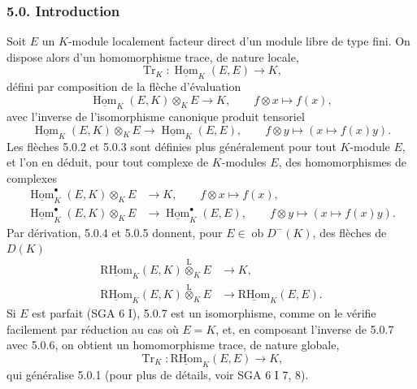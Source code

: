 \documentclass[11pt]{article}
\DeclareMathOperator{\Hom}{Hom}
\newcommand{\ob}{\operatorname{ob}}
\providecommand{\RHom}{\mathrm{RHom}}
\providecommand{\uRHom}{\underline{\RHom}}
\providecommand{\uHom}{\underline{\Hom}}
\providecommand{\Tr}{\operatorname{Tr}}
\providecommand{\Tr}{\operatorname{Tr}}
\providecommand{\lten}{\overset{\mathrm L}{\otimes}}
\providecommand{\Tr}{\operatorname{Tr}}
\providecommand{\RHom}{\mathrm{RHom}}
\providecommand{\Hom}{\operatorname{Hom}}
\providecommand{\ob}{\operatorname{ob}}
\providecommand{\lten}{\overset{\mathrm L}{\otimes}}
\providecommand{\RHom}{\mathrm R\mathcal{H}om}
\providecommand{\lten}{\overset{\mathrm L}{\otimes}}
\providecommand{\Tr}{\operatorname{Tr}}
\providecommand{\lten}{\overset{\mathrm L}{\otimes}}
\providecommand{\lten}{\overset{\mathrm L}{\otimes}}
\providecommand{\lten}{\overset{\mathrm L}{\otimes}}
\providecommand{\RHom}{\mathrm{RHom}}
\providecommand{\Hom}{\operatorname{Hom}}
\providecommand{\Tr}{\operatorname{Tr}}
\providecommand{\lten}{\overset{\mathrm L}{\otimes}}
\begin{document}
\subsubsection*{5.0. Introduction}

Soit $E$ un $K$-module localement facteur direct d'un module libre de type fini. On dispose alors d'un homomorphisme trace, de nature locale,
\begin{equation}\tag{5.0.1}
\Tr_K:\uHom_K(E,E)\longrightarrow K,
\end{equation}
défini par composition de la flèche d'évaluation
\begin{equation}\tag{5.0.2}
\uHom_K(E,K)\otimes_KE\longrightarrow K,\qquad f\otimes x\longmapsto f(x),
\end{equation}
avec l'inverse de l'isomorphisme canonique produit tensoriel
\begin{equation}\tag{5.0.3}
\uHom_K(E,K)\otimes_KE\longrightarrow\uHom_K(E,E),\qquad f\otimes y\longmapsto (x\longmapsto f(x)y).
\end{equation}
Les flèches 5.0.2 et 5.0.3 sont définies plus généralement pour tout $K$-module $E$, et l'on en déduit, pour tout complexe de $K$-modules $E$, des homomorphismes de complexes
\begin{align}
\uHom_K^\bullet(E,K)\otimes_KE&\longrightarrow K,\qquad f\otimes x\longmapsto f(x),\tag{5.0.4}\\
\uHom_K^\bullet(E,K)\otimes_KE&\longrightarrow \uHom_K^\bullet(E,E),\qquad f\otimes y\longmapsto (x\longmapsto f(x)y).\tag{5.0.5}
\end{align}
Par dérivation, 5.0.4 et 5.0.5 donnent, pour $E\in\ob D^-(K)$, des flèches de $D(K)$
\begin{align}
\uRHom_K(E,K)\lten_KE&\longrightarrow K,\tag{5.0.6}\\
\uRHom_K(E,K)\lten_KE&\longrightarrow\uRHom_K(E,E).\tag{5.0.7}
\end{align}
Si $E$ est parfait (SGA 6 I), 5.0.7 est un isomorphisme, comme on le vérifie facilement par réduction au cas où $E=K$, et, en composant l'inverse de 5.0.7 avec 5.0.6, on obtient un homomorphisme trace, de nature globale,
\begin{equation}\tag{5.0.8}
\Tr_K:\uRHom_K(E,E)\longrightarrow K,
\end{equation}
qui généralise 5.0.1 (pour plus de détails, voir SGA 6 I 7, 8).
\end{document}
